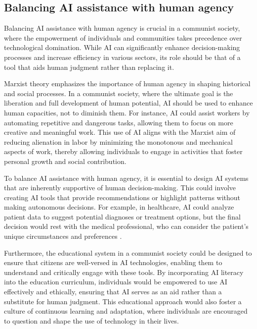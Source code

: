 \subsection{Balancing AI assistance with human agency}

Balancing AI assistance with human agency is crucial in a communist society, where the empowerment of individuals and communities takes precedence over technological domination. While AI can significantly enhance decision-making processes and increase efficiency in various sectors, its role should be that of a tool that aids human judgment rather than replacing it.

Marxist theory emphasizes the importance of human agency in shaping historical and social processes. In a communist society, where the ultimate goal is the liberation and full development of human potential, AI should be used to enhance human capacities, not to diminish them. For instance, AI could assist workers by automating repetitive and dangerous tasks, allowing them to focus on more creative and meaningful work. This use of AI aligns with the Marxist aim of reducing alienation in labor by minimizing the monotonous and mechanical aspects of work, thereby allowing individuals to engage in activities that foster personal growth and social contribution.

To balance AI assistance with human agency, it is essential to design AI systems that are inherently supportive of human decision-making. This could involve creating AI tools that provide recommendations or highlight patterns without making autonomous decisions. For example, in healthcare, AI could analyze patient data to suggest potential diagnoses or treatment options, but the final decision would rest with the medical professional, who can consider the patient's unique circumstances and preferences \cite[pp.~210-215]{Topol2019DeepMedicine}.

Furthermore, the educational system in a communist society could be designed to ensure that citizens are well-versed in AI technologies, enabling them to understand and critically engage with these tools. By incorporating AI literacy into the education curriculum, individuals would be empowered to use AI effectively and ethically, ensuring that AI serves as an aid rather than a substitute for human judgment. This educational approach would also foster a culture of continuous learning and adaptation, where individuals are encouraged to question and shape the use of technology in their lives.

